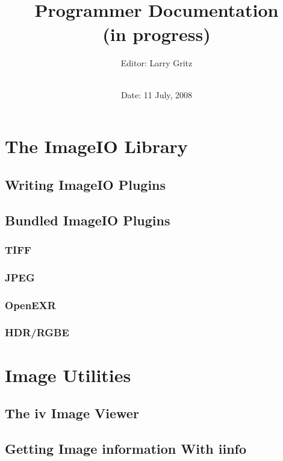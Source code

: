 \documentclass[11pt,letterpaper]{book}
\title{ 
{\Huge{\bf \product}
{\bf\sffamily \versionnumber} \medskip \\ \huge Programmer Documentation
\\ \large (in progress) 
} \bigskip }
\author{Editor: Larry Gritz \\
 \bigskip \\
}
\date{{\large 
Date: 11 July, 2008
}}
\begin{document}
\frontmatter

\maketitle

%

\setcounter{tocdepth}{1}
\tableofcontents

\mainmatter

%

\part{The ImageIO Library}





\chapter{Writing ImageIO Plugins}

\chapter{Bundled ImageIO Plugins}
\section{TIFF}
\section{JPEG}
\section{OpenEXR}
\section{HDR/RGBE}


\part{Image Utilities}

\chapter{The {\kw iv} Image Viewer}
\chapter{Getting Image information With {\kw iinfo}}
\end{document}

